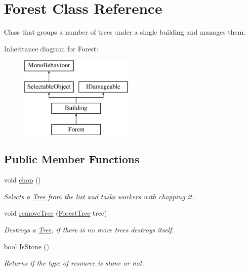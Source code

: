 \hypertarget{class_forest}{}\section{Forest Class Reference}
\label{class_forest}


Class that groups a number of trees under a single building and manages them.  


Inheritance diagram for Forest\+:\begin{figure}[H]
\begin{center}
\leavevmode
\includegraphics[height=4.000000cm]{class_forest}
\end{center}
\end{figure}
\subsection*{Public Member Functions}
\begin{DoxyCompactItemize}
\item 
void \mbox{\hyperlink{class_forest_a353da5f43e948f6c3c4c5a8dd255bcce}{chop}} ()
\begin{DoxyCompactList}\small\item\em Selects a \mbox{\hyperlink{class_tree}{Tree}} from the list and tasks workers with chopping it. \end{DoxyCompactList}\item 
void \mbox{\hyperlink{class_forest_ac905399d43a853c201fefd4c055afcec}{remove\+Tree}} (\mbox{\hyperlink{class_forest_tree}{Forest\+Tree}} tree)
\begin{DoxyCompactList}\small\item\em Destroys a \mbox{\hyperlink{class_tree}{Tree}}, if there is no more trees destroys itself. \end{DoxyCompactList}\item 
bool \mbox{\hyperlink{class_forest_a7e93acae12bdeeac94b41a214ca0b1ce}{Is\+Stone}} ()
\begin{DoxyCompactList}\small\item\em Returns if the type of resource is stone or not. \end{DoxyCompactList}\end{DoxyCompactItemize}
